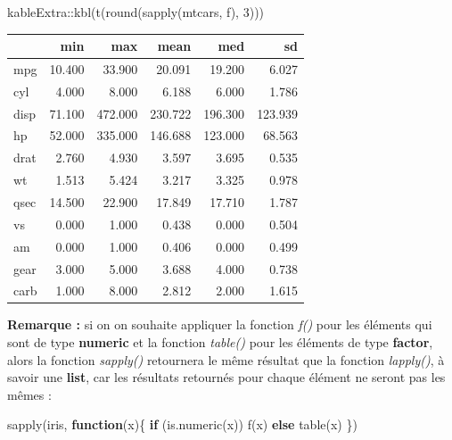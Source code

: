 \documentclass[
]{book}
\newenvironment{Shaded}{\begin{snugshade}}{\end{snugshade}}
\newcommand{\ControlFlowTok}[1]{\textcolor[rgb]{0.13,0.29,0.53}{\textbf{#1}}}
\newcommand{\DecValTok}[1]{\textcolor[rgb]{0.00,0.00,0.81}{#1}}
\newcommand{\FunctionTok}[1]{\textcolor[rgb]{0.00,0.00,0.00}{#1}}
\newcommand{\NormalTok}[1]{#1}
\newcommand{\SpecialCharTok}[1]{\textcolor[rgb]{0.00,0.00,0.00}{#1}}
\theoremstyle{definition}
\theoremstyle{definition}
\theoremstyle{definition}
\theoremstyle{definition}
\theoremstyle{remark}
\begin{document}
\begin{Shaded}
\begin{Highlighting}[]
\NormalTok{kableExtra}\SpecialCharTok{::}\FunctionTok{kbl}\NormalTok{(}\FunctionTok{t}\NormalTok{(}\FunctionTok{round}\NormalTok{(}\FunctionTok{sapply}\NormalTok{(mtcars, f), }\DecValTok{3}\NormalTok{))) }
\end{Highlighting}
\end{Shaded}

\begin{tabular}[t]{l|r|r|r|r|r}
\hline
  & min & max & mean & med & sd\\
\hline
mpg & 10.400 & 33.900 & 20.091 & 19.200 & 6.027\\
\hline
cyl & 4.000 & 8.000 & 6.188 & 6.000 & 1.786\\
\hline
disp & 71.100 & 472.000 & 230.722 & 196.300 & 123.939\\
\hline
hp & 52.000 & 335.000 & 146.688 & 123.000 & 68.563\\
\hline
drat & 2.760 & 4.930 & 3.597 & 3.695 & 0.535\\
\hline
wt & 1.513 & 5.424 & 3.217 & 3.325 & 0.978\\
\hline
qsec & 14.500 & 22.900 & 17.849 & 17.710 & 1.787\\
\hline
vs & 0.000 & 1.000 & 0.438 & 0.000 & 0.504\\
\hline
am & 0.000 & 1.000 & 0.406 & 0.000 & 0.499\\
\hline
gear & 3.000 & 5.000 & 3.688 & 4.000 & 0.738\\
\hline
carb & 1.000 & 8.000 & 2.812 & 2.000 & 1.615\\
\hline
\end{tabular}

\textbf{Remarque :} si on on souhaite appliquer la fonction \emph{f()} pour les éléments qui sont de type \textbf{numeric} et la fonction \emph{table()} pour les éléments de type \textbf{factor}, alors la fonction \emph{sapply()} retournera le même résultat que la fonction \emph{lapply()}, à savoir une \textbf{list}, car les résultats retournés pour chaque élément ne seront pas les mêmes :

\begin{Shaded}
\begin{Highlighting}[]
\FunctionTok{sapply}\NormalTok{(iris, }\ControlFlowTok{function}\NormalTok{(x)\{}
  \ControlFlowTok{if}\NormalTok{ (}\FunctionTok{is.numeric}\NormalTok{(x)) }
    \FunctionTok{f}\NormalTok{(x)}
  \ControlFlowTok{else}
    \FunctionTok{table}\NormalTok{(x)}
\NormalTok{\})}
\end{Highlighting}
\end{Shaded}
\end{document}
